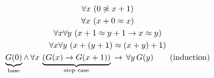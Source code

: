 \begin{gather*}
\forall x\,\left(
0 \not\approx x + 1
\right)
\\
\forall x\,\left(
x + 0 \approx x
\right)
\\
\forall x\forall y\,\left(
x + 1 \approx y + 1 \rightarrow x \approx y
\right)
\\
\forall x\forall y\,\left(
x+(y+1) \approx (x+y)+1
\right)\\
\underbrace{G(0)}_{\text{base}} 
\land\, \forall x\,\underbrace{
\left(G(x) \rightarrow G(x+1)\right)
}_{\text{step case}}
\,\rightarrow\, \forall y\,G(y)
\tag{induction}
\end{gather*}